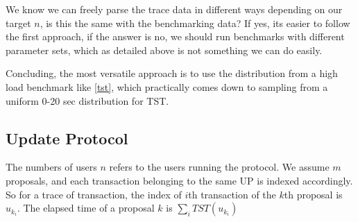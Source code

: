 We know we can freely parse the trace data in different ways depending on our
target $n$, is this the same with the benchmarking data? If yes, its easier to
follow the first approach, if the answer is no, we should run benchmarks with
different parameter sets, which as detailed above is not something we can do
easily.

Concluding, the most versatile approach is to use the distribution from a high
load benchmark like \ref{tst}, which practically comes down to sampling from a
uniform 0-20 sec distribution for TST.

\subsection{Update Protocol}
The numbers of users $n$ refers to the users running the protocol. We assume
$m$ proposals, and each transaction belonging to the same UP is indexed
accordingly. So for a trace of transaction, the index of $i$th transaction of the $k$th proposal is
    $u_{{k_i}}$. The elapsed time of a proposal $k$ is $\sum_{i} TST( u_{{k_i}}
    )$


